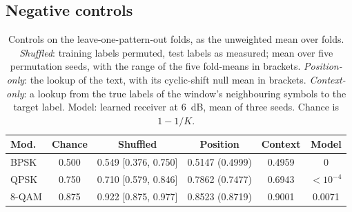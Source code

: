 \documentclass{ieeeaccess}
\begin{document}
\subsection{Negative controls}
\label{sec:controls}
\begin{table}[!t]
\caption{Controls on the leave-one-pattern-out folds, as the unweighted mean
over folds. \emph{Shuffled}: training labels permuted, test labels as
measured; mean over five permutation seeds, with the range of the five
fold-means in brackets. \emph{Position-only}: the lookup of the text, with
its cyclic-shift null mean in brackets. \emph{Context-only}: a lookup from the
true labels of the window's neighbouring symbols to the target label. Model:
learned receiver at $6$~dB, mean of three seeds. Chance is $1-1/K$.}
\label{tab:controls}
\centering
\footnotesize
\setlength{\tabcolsep}{1.8pt}
\begin{tabular}{lccccc}
\toprule
Mod. & Chance & Shuffled & Position & Context & Model \\
\midrule
BPSK & 0.500 & 0.549 [0.376, 0.750] & 0.5147 (0.4999) & 0.4959 & 0 \\
QPSK & 0.750 & 0.710 [0.579, 0.846] & 0.7862 (0.7477) & 0.6943 & $<\!10^{-4}$ \\
8-QAM & 0.875 & 0.922 [0.875, 0.977] & 0.8523 (0.8719) & 0.9001 & 0.0071 \\
\bottomrule
\end{tabular}
\end{table}
\end{document}
